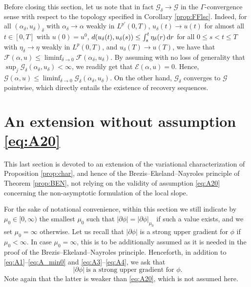 \documentclass[reqno]{amsart}
\renewcommand{\sl}{|\partial \phi|}
\newcommand{\GG}{{\mathcal G}}
\newcommand{\EE}{{\mathcal E}}
\newcommand{\FF}{{\mathcal F}}
\renewcommand{\d}{{\rm d}}
\begin{document}
 Before closing this section, let us note that in fact $\GG_\delta \to \GG$ in the $\Gamma$-convergence sense with respect to the topology specified in Corollary \ref{prop:FFlsc}. Indeed, for all $(\alpha_\delta,u_\delta)_\delta$ with $\alpha_\delta\to \alpha $ weakly in $L^{p'}(0,T)$, $u_\delta(t)\to u(t)$ for almost all $t \in [0,T]$ with $u(0)=u^0$, $d(u_\delta(t),u_\delta(s)) \leq \int_s^t \eta_\delta(r)\, \d r $ for all $0\leq s <t \leq T$
with $\eta_\delta \to \eta$ weakly in $L^p(0,T)$, and $u_\delta(T)\to u(T)$, we have that $\FF(\alpha,u)\leq \liminf_{\delta\to 0}\FF(\alpha_\delta,u_\delta)$. By assuming with no loss of generality that $\sup_j\GG_\delta(\alpha_\delta,u_\delta)<\infty$, we readily get that $\EE(\alpha,u)=0$. Hence, $\GG(\alpha,u)\leq\liminf_{\delta\to 0}\GG_\delta(\alpha_\delta,u_\delta)$. On the other hand, $\GG_\delta$ converges to $\GG$ pointwise, which directly entails the existence of recovery sequences. 




\section{An extension  
   without assumption  \eqref{eq:A20}}\label{sec:beyond}


This last section is devoted to an extension of the variational
characterization of Proposition \ref{prop:char}, and hence of the
Brezis--Ekeland--Nayroles principle of  Theorem \ref{prop:BEN},
not relying on the validity of  assumption \eqref{eq:A20} concerning the non-asymptotic formulation of the local slope.

For the sake of notational convenience, within this section we still
indicate by $\mu_0 \in [0,\infty)$ the smallest $\mu_0$ such that
$\sl=\sl_{\mu_0}$ if such a value exists, and we set $\mu_0=\infty$ 
otherwise. Let
us recall that $\sl$ is a strong upper gradient for $\phi$ if
$\mu_0<\infty$. In case $\mu_0 =\infty$, this is to be additionally
assumed as it is needed in the proof of the
Brezis--Ekeland--Nayroles principle. Henceforth, in addition to \eqref{eq:A1}--\eqref{eq:A_min0} and
\eqref{eq:A3}--\eqref{eq:A4}, we ask that  
\begin{equation}
  \label{eq:A200}
 \ \sl \ \text{is a strong upper gradient
    for $\phi$}.
\end{equation}
Note again that the latter is weaker than \eqref{eq:A20}, which is not
assumed here.
\end{document}
